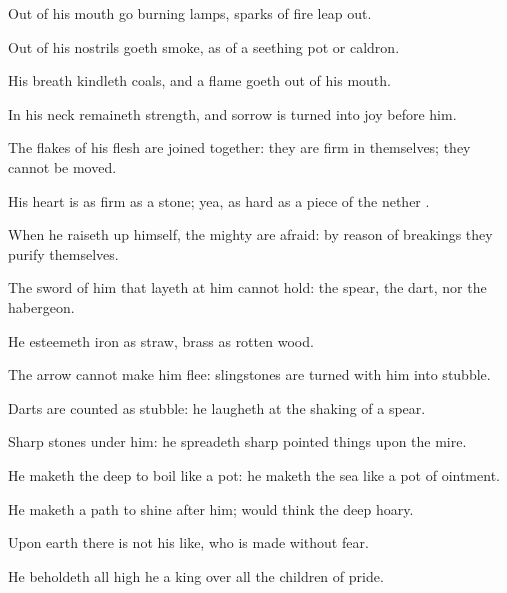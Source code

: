 {Out of his
mouth
go burning
lamps,
{}
sparks of
fire leap
out.

Out of his
nostrils
goeth
smoke, as
{} of a
seething
pot or
caldron.

His
breath
kindleth
coals, and a
flame goeth
out of his
mouth.

In his
neck
remaineth
strength, and
sorrow is turned into
joy
before him.

The
flakes of his
flesh are joined
together: they are
firm in themselves; they cannot be
moved.

His
heart is as
firm as a
stone; yea, as
hard as a
piece of the
nether
{}.

When he raiseth
up himself, the
mighty are
afraid: by reason of
breakings they
purify themselves.

The
sword of him that
layeth at him cannot
hold: the
spear, the
dart, nor the
habergeon.

He
esteemeth
iron as
straw,
{}
brass as
rotten
wood.

The
arrow cannot make him
flee:
slingstones are
turned with him into
stubble.

Darts are
counted as
stubble: he
laugheth at the
shaking of a
spear.

Sharp
stones
{} under him: he
spreadeth sharp pointed
things upon the
mire.

He maketh the
deep to
boil like a
pot: he
maketh the
sea like a pot of
ointment.

He maketh a
path to
shine
after him;
{} would
think the
deep
{}
hoary.

Upon
earth there is not his
like, who is
made
without
fear.

He
beholdeth all
high
{} he
{} a
king over all the
children of
pride.




\par }
